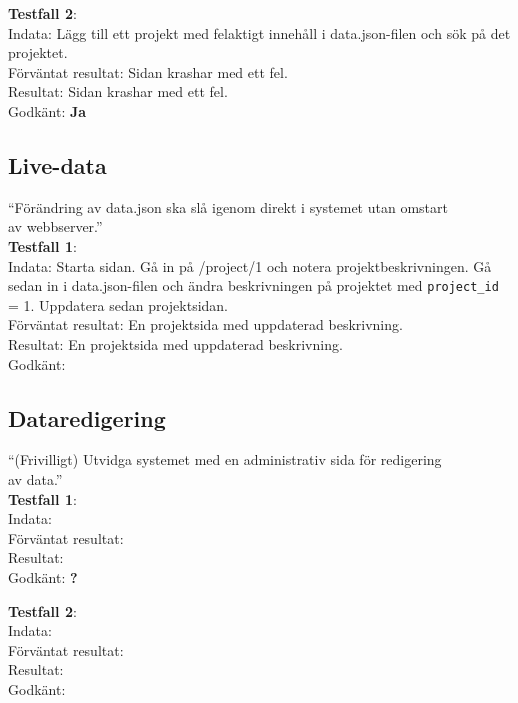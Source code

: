 \documentclass{TDP003mall}
\begin{document}
\textbf{Testfall 2}: \\
Indata: Lägg till ett projekt med felaktigt innehåll i data.json-filen och sök på det projektet.\\
Förväntat resultat: Sidan krashar med ett fel.\\
Resultat: Sidan krashar med ett fel.\\
Godkänt: \textbf{Ja}


\subsection{Live-data}
“Förändring av data.json ska slå igenom direkt i systemet utan omstart\\
av webbserver.”\\
\textbf{Testfall 1}: \\
Indata: Starta sidan. Gå in på /project/1 och notera projektbeskrivningen. Gå sedan in i data.json-filen och ändra beskrivningen på projektet med \verb|project_id| = 1. Uppdatera sedan projektsidan.\\
Förväntat resultat: En projektsida med uppdaterad beskrivning.\\
Resultat: En projektsida med uppdaterad beskrivning.\\
Godkänt: \textbf{}


\subsection{Dataredigering}
“(Frivilligt) Utvidga systemet med en administrativ sida för redigering\\
av data.”\\
\textbf{Testfall 1}:\\
Indata: \\
Förväntat resultat:\\
Resultat:\\
Godkänt: \textbf{?}

\textbf{Testfall 2}:\\
Indata:\\
Förväntat resultat:\\
Resultat:\\
Godkänt: \textbf{}
\end{document}
